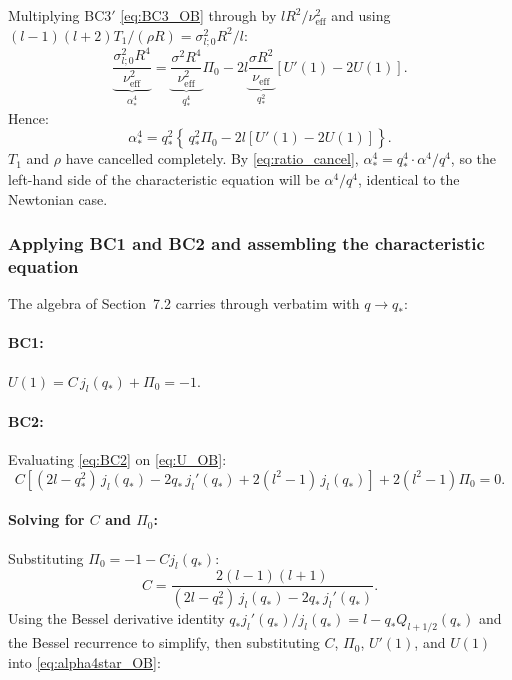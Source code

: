 \begin{derivbox}
Multiplying BC3$'$ \eqref{eq:BC3_OB} through by $lR^2/\nu_{\mathrm{eff}}^2$
and using $(l-1)(l+2)T_1/(\rho R) = \sigma_{l;0}^2 R^2/l$:
\[
  \underbrace{\frac{\sigma_{l;0}^2 R^4}{\nu_{\mathrm{eff}}^2}}_{\alpha_*^4}
  = \underbrace{\frac{\sigma^2 R^4}{\nu_{\mathrm{eff}}^2}}_{q_*^4}\Pi_0
  - 2l\underbrace{\frac{\sigma R^2}{\nu_{\mathrm{eff}}}}_{q_*^2}\!\left[U'(1)-2U(1)\right].
\]
Hence:
\begin{equation}
  \alpha_*^4 = q_*^2\!\left\{\,q_*^2\Pi_0
  - 2l\!\left[U'(1) - 2U(1)\right]\right\}.
  \label{eq:alpha4star_OB}
\end{equation}
$T_1$ and $\rho$ have cancelled completely. By \eqref{eq:ratio_cancel},
$\alpha_*^4 = q_*^4\cdot\alpha^4/q^4$, so the left-hand side of the
characteristic equation will be $\alpha^4/q^4$, identical to the Newtonian
case.
\end{derivbox}

\subsubsection{Applying BC1 and BC2 and assembling the characteristic equation}

The algebra of Section~7.2 carries through verbatim with $q \to q_*$:

\paragraph{BC1:} $U(1) = C\,j_l(q_*) + \Pi_0 = -1.$

\paragraph{BC2:} Evaluating \eqref{eq:BC2} on \eqref{eq:U_OB}:
\[
  C\!\left[(2l-q_*^2)\,j_l(q_*) - 2q_*\,j_l'(q_*) + 2(l^2-1)\,j_l(q_*)\right]
  + 2(l^2-1)\Pi_0 = 0.
\]

\paragraph{Solving for $C$ and $\Pi_0$:}
Substituting $\Pi_0 = -1 - C j_l(q_*)$:
\begin{equation}
  C = \frac{2(l-1)(l+1)}{(2l-q_*^2)\,j_l(q_*) - 2q_*\,j_l'(q_*)}.
  \label{eq:C_OB}
\end{equation}
Using the Bessel derivative identity $q_* j_l'(q_*)/j_l(q_*) =
l - q_* Q_{l+1/2}(q_*)$ and the Bessel recurrence to simplify, then
substituting $C$, $\Pi_0$, $U'(1)$, and $U(1)$ into \eqref{eq:alpha4star_OB}:

